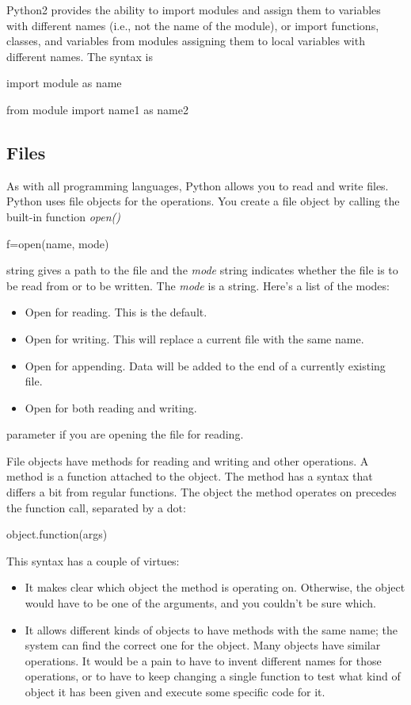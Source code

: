 Python2 provides the ability to
import modules and assign them to variables with different names (i.e.,
not the name of the module), or import functions, classes, and variables
from modules assigning them to local variables with different names. The
syntax is

import module as name

from module import name1 as name2

\subsection{Files}

As with all programming languages,
Python allows you to read and write files. Python uses file objects for
the operations. You create a file object by calling the built-in
function \emph{open()}

f=open(name, mode)

 string gives
a path to the file and the \emph{mode} string indicates whether the file
is to be read from or to be written. The \emph{mode} is a string. Here's
a list of the modes:

\begin{itemize}

\item
   Open for reading.
  This is the default.
\item
   Open for writing.
  This will replace a current file with the same name.
\item
   Open for appending.
  Data will be added to the end of a currently existing file.
\item
   Open for both
  reading and writing.
\end{itemize}


parameter if you are opening the file for reading.

File objects have methods for
reading and writing and other operations. A method is a function
attached to the object. The method has a syntax that differs a bit from
regular functions. The object the method operates on precedes the
function call, separated by a dot:

object.function(args)

This syntax has a couple of
virtues:

\begin{itemize}

\item
  It makes clear which object the
  method is operating on. Otherwise, the object would have to be one of
  the arguments, and you couldn't be sure which.
\item
  It allows different kinds of
  objects to have methods with the same name; the system can find the
  correct one for the object. Many objects have similar operations. It
  would be a pain to have to invent different names for those
  operations, or to have to keep changing a single function to test what
  kind of object it has been given and execute some specific code for
  it.
\end{itemize}

